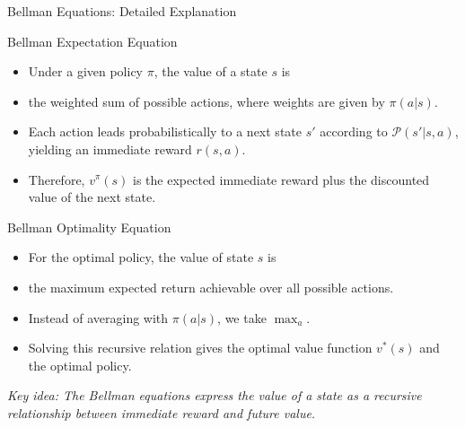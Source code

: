 \documentclass[aspectratio=169,10pt]{beamer}
\begin{document}
\begin{frame}{Bellman Equations: Detailed Explanation}

\begin{block}{Bellman Expectation Equation}
\begin{itemize}
    \item Under a given policy $\pi$, the value of a state $s$ is
    \item the weighted sum of possible actions, where weights are given by $\pi(a|s)$.
    \item Each action leads probabilistically to a next state $s'$ according to $\mathcal{P}(s'|s,a)$, yielding an immediate reward $r(s,a)$.
    \item Therefore, $v^\pi(s)$ is the expected immediate reward plus the discounted value of the next state.
\end{itemize}
\end{block}

\begin{block}{Bellman Optimality Equation}
\begin{itemize}
    \item For the optimal policy, the value of state $s$ is
    \item the maximum expected return achievable over all possible actions.
    \item Instead of averaging with $\pi(a|s)$, we take $\max_a$.
    \item Solving this recursive relation gives the optimal value function $v^*(s)$ and the optimal policy.
\end{itemize}
\end{block}

\begin{center}
\textit{Key idea: The Bellman equations express the value of a state as a recursive relationship between immediate reward and future value.}
\end{center}
\end{frame}
\end{document}
